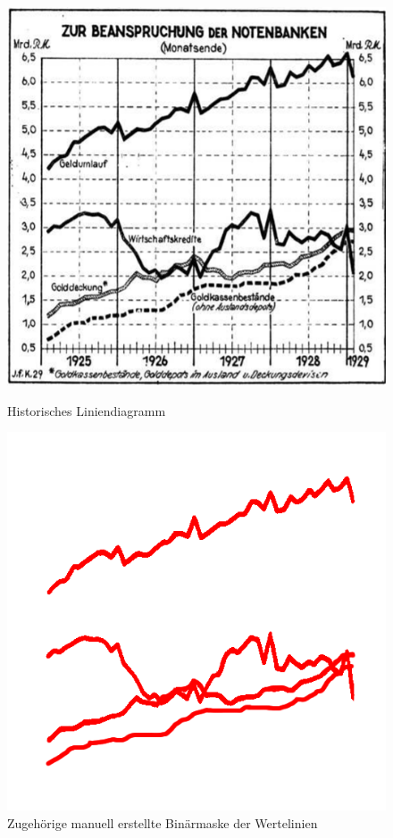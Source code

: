 \begin{figure}[H] %
    \centering
    \begin{minipage}{0.475\textwidth} %
        \centering
        \includegraphics[width=\linewidth]{Methodik/img/lines_historical.png}
        \caption{ Historisches Liniendiagramm \phantom{Platzhalter}}
        \label{fig:lines_historical}
    \end{minipage}\hfill %
    \begin{minipage}{0.475\textwidth} %
        \centering
        \includegraphics[width=\linewidth]{Methodik/img/lines_historical_mask.png}
        \caption{ Zugehörige manuell erstellte Binärmaske der Wertelinien}
        \label{fig:lines_historical_mask}
    \end{minipage}
\end{figure}
